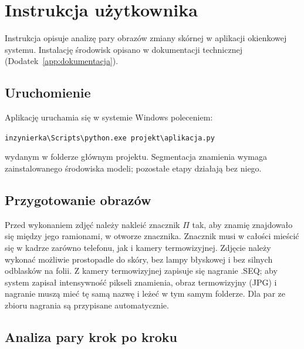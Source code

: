 
\chapter{Instrukcja użytkownika}
\label{app:instrukcja}

Instrukcja opisuje analizę pary obrazów zmiany skórnej w aplikacji okienkowej systemu. Instalację środowisk opisano w dokumentacji technicznej (Dodatek~\ref{app:dokumentacja}).

\section{Uruchomienie}

Aplikację uruchamia się w systemie Windows poleceniem:
\begin{center}
\texttt{inzynierka\textbackslash Scripts\textbackslash python.exe projekt\textbackslash aplikacja.py}
\end{center}
wydanym w folderze głównym projektu. Segmentacja znamienia wymaga zainstalowanego środowiska modeli; pozostałe etapy działają bez niego.

\section{Przygotowanie obrazów}

Przed wykonaniem zdjęć należy nakleić znacznik $\Pi$ tak, aby znamię znajdowało się między jego ramionami, w otworze znacznika. Znacznik musi w całości mieścić się w kadrze zarówno telefonu, jak i kamery termowizyjnej. Zdjęcie należy wykonać możliwie prostopadle do skóry, bez lampy błyskowej i bez silnych odblasków na folii. Z kamery termowizyjnej zapisuje się nagranie .SEQ; aby system zapisał intensywność pikseli znamienia, obraz termowizyjny (JPG) i nagranie muszą mieć tę samą nazwę i leżeć w tym samym folderze. Dla par ze zbioru nagrania są przypisane automatycznie.

\section{Analiza pary krok po kroku}

